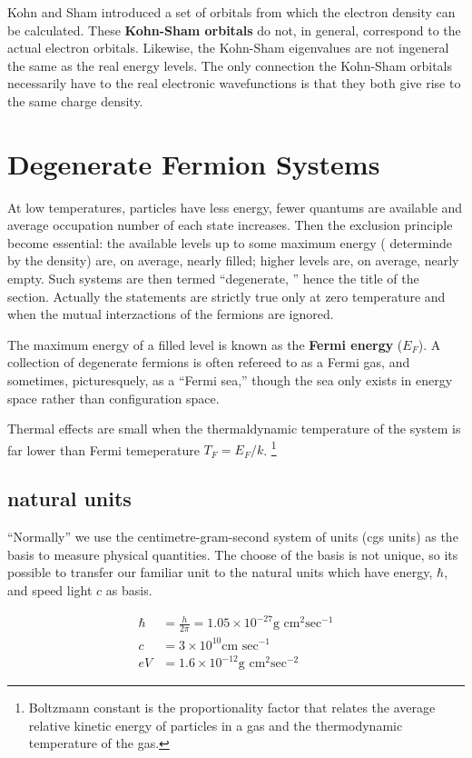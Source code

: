 \documentclass[a4paper, 11pt]{article}
\numberwithin{equation}{subsection}
\begin{document}
Kohn and Sham introduced a set of orbitals from which the electron density can be calculated. These \textbf{Kohn-Sham orbitals} do not, in general, correspond to the actual electron orbitals. Likewise, the Kohn-Sham eigenvalues  are not ingeneral the same as the real energy levels. The only connection the Kohn-Sham orbitals necessarily have to the real electronic wavefunctions is that they both give rise to the same charge density. 

\section{Degenerate Fermion Systems}

At low temperatures, particles have less energy, fewer quantums are available and average occupation number of each state increases. Then the exclusion principle become essential: the available levels up to some maximum energy ( determinde by the density) are, on average, nearly filled; higher levels are, on average, nearly empty. Such systems are then termed ``degenerate, '' hence the title of the section. Actually the statements are strictly true only at zero temperature and when the mutual interzactions of the fermions are ignored.

The maximum energy of a filled level is known as the \textbf{Fermi energy} ($E_F$). A collection of degenerate fermions is often refereed to as a Fermi gas, and sometimes, picturesquely, as a ``Fermi sea,'' though the sea only exists in energy space rather than configuration space. 

Thermal effects are small when the thermaldynamic temperature of the system is far lower than Fermi temeperature $T_F = E_F/k$. \footnote{Boltzmann constant is the proportionality factor that relates the average relative kinetic energy of particles in a gas and the thermodynamic temperature of the gas.} 


  \subsection{natural units}

    ``Normally'' we use the centimetre-gram-second system of units (cgs units) as the basis to measure physical quantities. The choose of the basis is not unique, so its possible to transfer our familiar unit to the natural units which have energy, $\hbar$, and speed light $c$ as basis.

    \begin{equation}
      \begin{aligned}
      \label{eq:natural-quantities}
      \hbar &= \frac{h}{2\pi} = 1.05 \times 10^{-27} \textrm{g cm}^2 \textrm{sec} ^{-1}\\
      c &= 3 \times 10 ^{10} \textrm{cm sec}^{-1}\\
      eV &= 1.6 \times 10 ^{-12} \textrm{g cm}^2 \textrm{sec}^{-2}
    \end{aligned}
  \end{equation}
\end{document}
